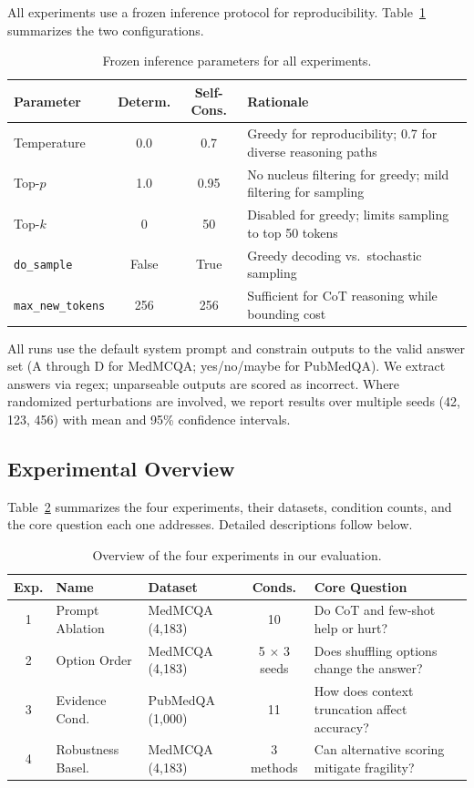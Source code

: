 \documentclass[runningheads,a4paper]{llncs}
\begin{document}
All experiments use a frozen inference protocol for reproducibility. Table~\ref{tab:inference} summarizes the two configurations.

\begin{table}[t]
\centering
\caption{Frozen inference parameters for all experiments.}
\label{tab:inference}
\begin{tabular}{lccp{3.8cm}}
\toprule
\textbf{Parameter} & \textbf{Determ.} & \textbf{Self-Cons.} & \textbf{Rationale} \\
\midrule
Temperature & 0.0 & 0.7 & Greedy for reproducibility; 0.7 for diverse reasoning paths \\
Top-$p$ & 1.0 & 0.95 & No nucleus filtering for greedy; mild filtering for sampling \\
Top-$k$ & 0 & 50 & Disabled for greedy; limits sampling to top 50 tokens \\
\texttt{do\_sample} & False & True & Greedy decoding vs.\ stochastic sampling \\
\texttt{max\_new\_tokens} & 256 & 256 & Sufficient for CoT reasoning while bounding cost \\
\bottomrule
\end{tabular}
\end{table}

All runs use the default system prompt and constrain outputs to the valid answer set (A through D for MedMCQA; yes/no/maybe for PubMedQA). We extract answers via regex; unparseable outputs are scored as incorrect. Where randomized perturbations are involved, we report results over multiple seeds (42, 123, 456) with mean and 95\% confidence intervals.

\subsection{Experimental Overview}

Table~\ref{tab:experiment_overview} summarizes the four experiments, their datasets, condition counts, and the core question each one addresses. Detailed descriptions follow below.

\begin{table}[t]
\centering
\caption{Overview of the four experiments in our evaluation.}
\label{tab:experiment_overview}
\begin{tabular}{clp{2.2cm}cp{3.4cm}}
\toprule
\textbf{Exp.} & \textbf{Name} & \textbf{Dataset} & \textbf{Conds.} & \textbf{Core Question} \\
\midrule
1 & Prompt Ablation & MedMCQA (4,183) & 10 & Do CoT and few-shot help or hurt? \\
2 & Option Order & MedMCQA (4,183) & 5 $\times$ 3 seeds & Does shuffling options change the answer? \\
3 & Evidence Cond. & PubMedQA (1,000) & 11 & How does context truncation affect accuracy? \\
4 & Robustness Basel. & MedMCQA (4,183) & 3 methods & Can alternative scoring mitigate fragility? \\
\bottomrule
\end{tabular}
\end{table}
\end{document}
